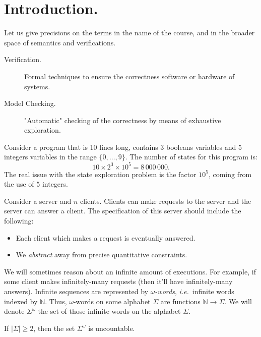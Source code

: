 \documentclass[./main]{subfiles}
\begin{document}
  \chapter{Introduction.}

  Let us give precisions on the terms in the name of the course, and in the broader space of semantics and verifications.
  \begin{description}
    \item[Verification.] Formal techniques to ensure the correctness software or hardware of systems.
    \item[Model Checking.]
      "Automatic" checking of the correctness by means of exhaustive exploration.
  \end{description}

  \begin{exm}
    Consider a program that is 10 lines long, contains 3 booleans variables and 5 integers variables in the range $\{0, \ldots, 9\}$.
    The number of states for this program is:
    \[
    10 \times 2^3 \times 10^5 = 8\,000\,000
    .\]
    The real issue with the state exploration problem is the factor $10^5$, coming from the use of $5$ integers.
  \end{exm}

  \begin{exm}
    Consider a server and $n$ clients. Clients can make requests to the server and the server can answer a client.
    The specification of this server should include the following:
    \begin{itemize}
      \item Each client which makes a request is eventually answered.
      \item We \textit{abstract} away from precise quantitative constraints.
    \end{itemize}
  \end{exm}

  We will sometimes reason about an infinite amount of executions.
  For example, if some client makes infinitely-many requests (then it'll have infinitely-many answers).
  Infinite sequences are represented by \textit{$\omega$-words}, \textit{i.e.}\ infinite words indexed by $\mathds{N}$.
  Thus, $\omega$-words on some alphabet $\Sigma$ are functions $\mathds{N} \to \Sigma$. We will denote $\Sigma^\omega$ the set of those infinite words on the alphabet $\Sigma$.

  If $|\Sigma| \ge 2$, then the set $\Sigma^\omega$ is uncountable.
\end{document}
